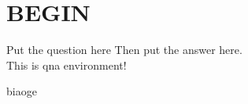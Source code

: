 \documentclass{spaexp}
\begin{document}
     
\maketitle
\section{BEGIN}

\begin{qna}{Put the question here}
    Then put the answer here.\\
    This is qna environment!
\end{qna}


\begin{step}
    \caption{biaoge}\\
    \movehead
\end{step}

\recordhead
\end{document}
